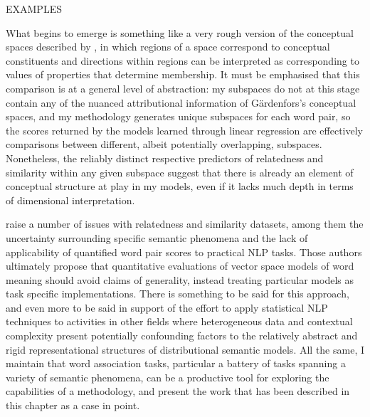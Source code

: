 EXAMPLES

What begins to emerge is something like a very rough version of the conceptual spaces described by \cite{Gardenfors2000}, in which regions of a space correspond to conceptual constituents and directions within regions can be interpreted as corresponding to values of properties that determine membership.  It must be emphasised that this comparison is at a general level of abstraction: my subspaces do not at this stage contain any of the nuanced attributional information of G\"{a}rdenfors's conceptual spaces, and my methodology generates unique subspaces for each word pair, so the scores returned by the models learned through linear regression are effectively comparisons between different, albeit potentially overlapping, subspaces.  Nonetheless, the reliably distinct respective predictors of relatedness and similarity within any given subspace suggest that there is already an element of conceptual structure at play in my models, even if it lacks much depth in terms of dimensional interpretation.

\cite{FaruquiEA2016} raise a number of issues with relatedness and similarity datasets, among them the uncertainty surrounding specific semantic phenomena and the lack of applicability of quantified word pair scores to practical NLP tasks.  Those authors ultimately propose that quantitative evaluations of vector space models of word meaning should avoid claims of generality, instead treating particular models as task specific implementations.  There is something to be said for this approach, and even more to be said in support of the effort to apply statistical NLP techniques to activities in other fields where heterogeneous data and contextual complexity present potentially confounding factors to the relatively abstract and rigid representational structures of distributional semantic models.  All the same, I maintain that word association tasks, particular a battery of tasks spanning a variety of semantic phenomena, can be a productive tool for exploring the capabilities of a methodology, and present the work that has been described in this chapter as a case in point.

